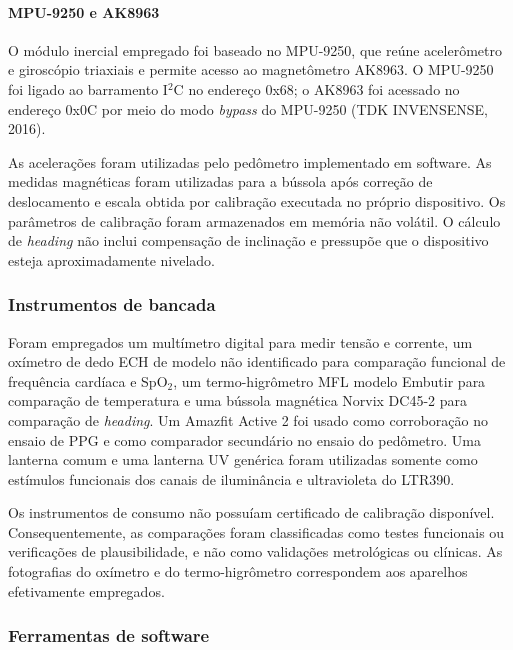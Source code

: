 \documentclass[a4paper,12pt]{article}
\begin{document}
\paragraph{MPU-9250 e AK8963}


O m\'odulo inercial empregado foi baseado no MPU-9250, que re\'une aceler\^ometro e girosc\'opio triaxiais e permite acesso ao magnet\^ometro AK8963. O MPU-9250 foi ligado ao barramento I$^2$C no endere\c{c}o 0x68; o AK8963 foi acessado no endere\c{c}o 0x0C por meio do modo \emph{bypass} do MPU-9250 (TDK INVENSENSE, 2016).


As acelera\c{c}\~oes foram utilizadas pelo ped\^ometro implementado em software. As medidas magn\'eticas foram utilizadas para a b\'ussola ap\'os corre\c{c}\~ao de deslocamento e escala obtida por calibra\c{c}\~ao executada no pr\'oprio dispositivo. Os par\^ametros de calibra\c{c}\~ao foram armazenados em mem\'oria n\~ao vol\'atil. O c\'alculo de \emph{heading} n\~ao inclui compensa\c{c}\~ao de inclina\c{c}\~ao e pressup\~oe que o dispositivo esteja aproximadamente nivelado.


\subsubsection{Instrumentos de bancada}

Foram empregados um mult\'imetro digital para medir tens\~ao e corrente, um ox\'imetro de dedo ECH de modelo n\~ao identificado para compara\c{c}\~ao funcional de frequ\^encia card\'iaca e SpO$_2$, um termo-higr\^ometro MFL modelo Embutir para compara\c{c}\~ao de temperatura e uma b\'ussola magn\'etica Norvix DC45-2 para compara\c{c}\~ao de \emph{heading}. Um Amazfit Active 2 foi usado como corrobora\c{c}\~ao no ensaio de PPG e como comparador secund\'ario no ensaio do ped\^ometro. Uma lanterna comum e uma lanterna UV gen\'erica foram utilizadas somente como est\'imulos funcionais dos canais de ilumin\^ancia e ultravioleta do LTR390.

Os instrumentos de consumo n\~ao possu\'iam certificado de calibra\c{c}\~ao dispon\'ivel. Consequentemente, as compara\c{c}\~oes foram classificadas como testes funcionais ou verifica\c{c}\~oes de plausibilidade, e n\~ao como valida\c{c}\~oes metrol\'ogicas ou cl\'inicas. As fotografias do ox\'imetro e do termo-higr\^ometro correspondem aos aparelhos efetivamente empregados.


\subsubsection{Ferramentas de software}
\end{document}
